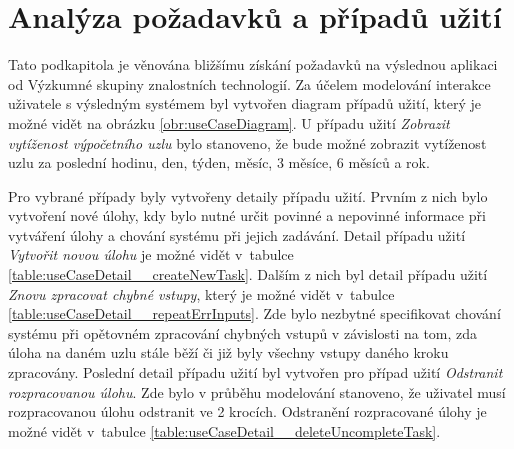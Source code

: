 \section{Analýza požadavků a případů užití}
\label{section:analysisANdUseCaseDiagram}

Tato podkapitola je věnována bližšímu získání požadavků na výslednou aplikaci od Výzkumné skupiny znalostních technologií. Za účelem modelování interakce uživatele s výsledným systémem byl vytvořen diagram případů užití, který je možné vidět na obrázku \ref{obr:useCaseDiagram}. U případu užití \textit{Zobrazit vytíženost výpočetního uzlu} bylo stanoveno, že bude možné zobrazit vytíženost uzlu za poslední hodinu, den, týden, měsíc, 3 měsíce, 6 měsíců a rok.

Pro vybrané případy byly vytvořeny detaily případu užití. Prvním z nich bylo vytvoření nové úlohy, kdy bylo nutné určit povinné a nepovinné informace při vytváření úlohy a chování systému při jejich zadávání. Detail případu užití \textit{Vytvořit novou úlohu} je možné vidět v~tabulce \ref{table:useCaseDetail__createNewTask}. Dalším z nich byl detail případu užití \textit{Znovu zpracovat chybné vstupy}, který je možné vidět v~tabulce \ref{table:useCaseDetail__repeatErrInputs}. Zde bylo nezbytné specifikovat chování systému při opětovném zpracování chybných vstupů v závislosti na tom, zda úloha na daném uzlu stále běží či již byly všechny vstupy daného kroku zpracovány. Poslední detail případu užití byl vytvořen pro případ užití \textit{Odstranit rozpracovanou úlohu}. Zde bylo v průběhu modelování stanoveno, že uživatel musí rozpracovanou úlohu odstranit ve 2 krocích. Odstranění rozpracované úlohy je možné vidět v~tabulce \ref{table:useCaseDetail__deleteUncompleteTask}.


